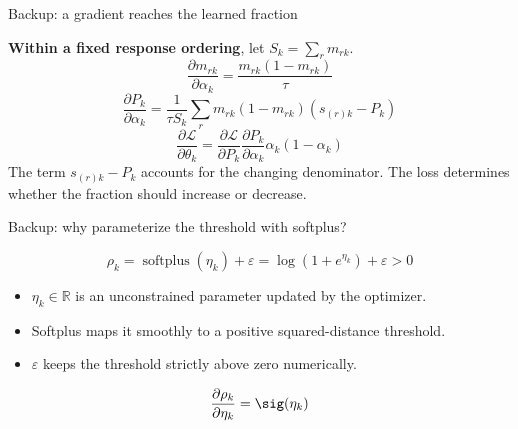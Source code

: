 \begin{frame}{Backup: a gradient reaches the learned fraction}

\textbf{Within a fixed response ordering}, let $S_k=\sum_r m_{rk}$.
\[\frac{\partial m_{rk}}{\partial\alpha_k}=\frac{m_{rk}(1-m_{rk})}{\tau}\]
\[\boxed{\frac{\partial P_k}{\partial\alpha_k}
=\frac1{\tau S_k}\sum_r m_{rk}(1-m_{rk})(s_{(r)k}-P_k)}\]
\[\frac{\partial\mathcal L}{\partial\theta_k}
=\frac{\partial\mathcal L}{\partial P_k}
\frac{\partial P_k}{\partial\alpha_k}\alpha_k(1-\alpha_k)\]
\small The term $s_{(r)k}-P_k$ accounts for the changing denominator. The loss determines whether the fraction should increase or decrease.

\end{frame}

\begin{frame}{Backup: why parameterize the threshold with softplus?}

\[\rho_k=\operatorname{softplus}(\eta_k)+\varepsilon
=\log(1+e^{\eta_k})+\varepsilon>0\]
\begin{itemize}
\item $\eta_k\in\mathbb R$ is an unconstrained parameter updated by the optimizer.
\item Softplus maps it smoothly to a positive squared-distance threshold.
\item $\varepsilon$ keeps the threshold strictly above zero numerically.
\end{itemize}
\[\frac{\partial\rho_k}{\partial\eta_k}=\sig(\eta_k)\]

\end{frame}


